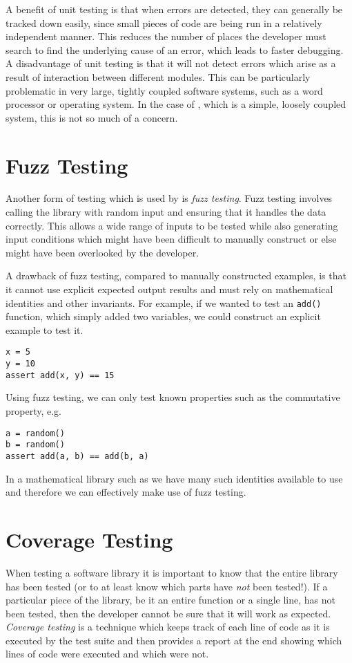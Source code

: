 A benefit of unit testing is that when errors are detected, they can generally be tracked down easily, since small pieces of code are being run in a relatively independent manner.
This reduces the number of places the developer must search to find the underlying cause of an error, which leads to faster debugging.
A disadvantage of unit testing is that it will not detect errors which arise as a result of interaction between different modules.
This can be particularly problematic in very large, tightly coupled software systems, such as a word processor or operating system.
In the case of \pygeom\!\!, which is a simple, loosely coupled system, this is not so much of a concern.

\section{Fuzz Testing}

Another form of testing which is used by \pygeom is \emph{fuzz testing}.
Fuzz testing involves calling the library with random input and ensuring that it handles the data correctly.
This allows a wide range of inputs to be tested while also generating input conditions which might have been difficult to manually construct or else might have been overlooked by the developer.

A drawback of fuzz testing, compared to manually constructed examples, is that it cannot use explicit expected output results and must rely on mathematical identities and other invariants.
For example, if we wanted to test an \texttt{add()} function, which simply added two variables, we could construct an explicit example to test it.
\begin{verbatim}
x = 5
y = 10
assert add(x, y) == 15
\end{verbatim}
Using fuzz testing, we can only test known properties such as the commutative property, e.g.
\begin{verbatim}
a = random()
b = random()
assert add(a, b) == add(b, a)
\end{verbatim}
In a mathematical library such as \pygeom we have many such identities available to use and therefore we can effectively make use of fuzz testing.

\section{Coverage Testing}

When testing a software library it is important to know that the entire library has been tested (or to at least know which parts have \emph{not} been tested!).
If a particular piece of the library, be it an entire function or a single line, has not been tested, then the developer cannot be sure that it will work as expected.
\emph{Coverage testing} is a technique which keeps track of each line of code as it is executed by the test suite and then provides a report at the end showing which lines of code were executed and which were not.

